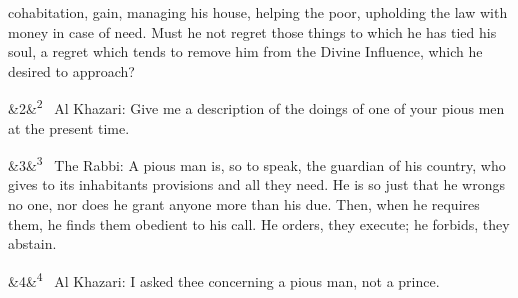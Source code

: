 \documentclass[12pt]{article}
\newcommand{\para}[1][]{\par\noindent\ifx&#1&\else\textsuperscript{\footnotesize #1}~\fi}
\begin{document}
cohabitation, gain, managing his house, helping the poor, upholding the law with money in case of need. Must he not regret those things to which he has tied his soul, a regret which tends to remove him from the Divine Influence, which he desired to approach?

\para[2] Al Khazari: Give me a description of the doings of one of your pious men at the present time.

\para[3] The Rabbi: A pious man is, so to speak, the guardian of his country, who gives to its inhabitants provisions and all they need. He is so just that he wrongs no one, nor does he grant anyone more than his due. Then, when he requires them, he finds them obedient to his call. He orders, they execute; he forbids, they abstain.

\para[4] Al Khazari: I asked thee concerning a pious man, not a prince.
\end{document}
